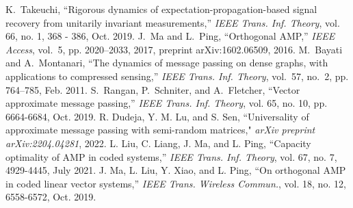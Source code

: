 \documentclass[journal]{IEEEtran}
\begin{document}
\begin{thebibliography}{1}
K.~Takeuchi, ``Rigorous dynamics of expectation-propagation-based signal recovery from unitarily invariant measurements,'' \textit{{IEEE} Trans. Inf. Theory}, vol. 66, no. 1, 368 - 386, Oct. 2019.  
J.~Ma and L.~Ping, ``Orthogonal {AMP},'' \textit{IEEE Access}, vol.~5, pp. 2020--2033, 2017, preprint arXiv:1602.06509, 2016.
M.~Bayati and A.~Montanari, ``The dynamics of message passing on dense graphs,
  with applications to compressed sensing,''  \textit{{IEEE} Trans. Inf. Theory},
  vol.~57, no.~2, pp. 764--785, Feb. 2011.
S.~Rangan, P.~Schniter, and A.~Fletcher, ``Vector approximate message passing,''  \textit{{IEEE} Trans. Inf. Theory},  vol. 65, no. 10, pp. 6664-6684, Oct. 2019. 
R. Dudeja, Y. M. Lu, and S. Sen, ``Universality of approximate message passing with semi-random matrices," \textit{arXiv preprint arXiv:2204.04281}, 2022.
L. Liu, C. Liang, J. Ma, and L. Ping, ``Capacity optimality of AMP in coded systems,'' \textit{{IEEE} Trans. Inf. Theory}, vol. 67, no. 7, 4929-4445, July 2021.
J. Ma, L. Liu, Y. Xiao, and L. Ping, ``On orthogonal AMP in coded linear vector systems,'' \textit{IEEE Trans. Wireless Commun.}, vol. 18, no. 12, 6558-6572, Oct. 2019.  


\end{thebibliography}
\end{document}

